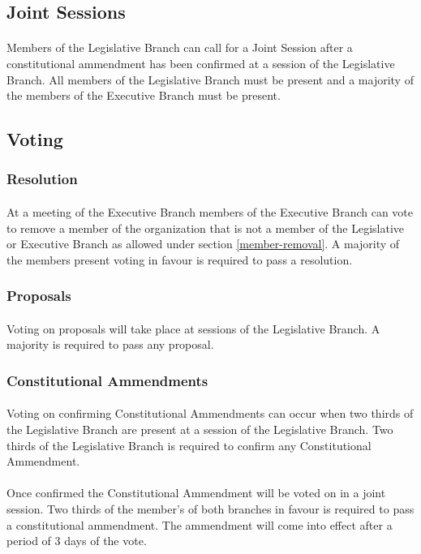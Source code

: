 \documentclass[10pt,a4paper]{article}
\begin{document}
\subsection{Joint Sessions}
\paragraph{}
Members of the Legislative Branch can call for a Joint Session after a constitutional ammendment has been confirmed at a session of the Legislative Branch. All members of the Legislative Branch must be present and a majority of the members of the Executive Branch must be present.
\subsection{Voting}
\subsubsection{Resolution}
\paragraph{}
At a meeting of the Executive Branch members of the Executive Branch can vote to remove a member of the organization that is not a member of the Legislative or Executive Branch as allowed under section \ref{member-removal}. A majority of the members present voting in favour is required to pass a resolution.
\subsubsection{Proposals}
\paragraph{}
Voting on proposals will take place at sessions of the Legislative Branch. A majority is required to pass any proposal.
\subsubsection{Constitutional Ammendments}
\paragraph{}
Voting on confirming Constitutional Ammendments can occur when two thirds of the Legislative Branch are present at a session of the Legislative Branch. Two thirds of the Legislative Branch is required to confirm any Constitutional Ammendment.
\paragraph{}
Once confirmed the Constitutional Ammendment will be voted on in a joint session. Two thirds of the member's of both branches in favour is required to pass a constitutional ammendment. The ammendment will come into effect after a period of 3 days of the vote.
\end{document}
